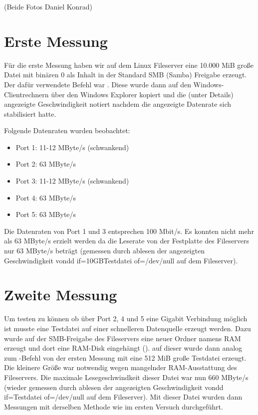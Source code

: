 \documentclass[12pt,a4paper,titlepage]{scrartcl} %
\begin{document}
(Beide Fotos \textcopyright Daniel Konrad)

\newpage
\section{Erste Messung}
Für die erste Messung haben wir auf dem Linux Fileserver eine 10.000 MiB große Datei mit binären 0 als Inhalt in der Standard SMB (Samba) Freigabe erzeugt. Der dafür verwendete Befehl war \normalfont. Diese wurde dann auf den Windows-Clientrechnern über  den Windows Explorer kopiert und die (unter Details) angezeigte Geschwindigkeit notiert nachdem die angezeigte Datenrate sich stabilisiert hatte.

Folgende Datenraten wurden beobachtet:
\begin{itemize}
\item Port 1: 11-12 MByte/s (schwankend)
\item Port 2: 63 MByte/s
\item Port 3: 11-12 MByte/s (schwankend)
\item Port 4: 63 MByte/s
\item Port 5: 63 MByte/s
\end{itemize}
Die Datenraten von Port 1 und 3 entsprechen 100 Mbit/s.
Es konnten nicht mehr als 63 MByte/s erzielt werden da die Leserate von der Festplatte des Fileservers nur 63 MByte/s beträgt (gemessen durch ablesen der angezeigten Geschwindigkeit von\ttfamily dd if=10GBTestdatei of=/dev/null \normalfont auf dem Fileserver).

\newpage
\section{Zweite Messung}
Um testen zu können ob über Port 2, 4 und 5 eine Gigabit Verbindung möglich ist musste eine Testdatei auf einer schnelleren Datenquelle erzeugt werden. Dazu wurde auf der SMB-Freigabe des Fileservers eine neuer Ordner namens RAM erzeugt und dort eine RAM-Disk eingehängt (\normalfont). auf dieser wurde dann analog zum \normalfont-Befehl von der ersten Messung mit \normalfont eine 512 MiB große Testdatei erzeugt. Die kleinere Größe war notwendig wegen mangelnder RAM-Ausstattung des Fileservers. Die maximale Lesegeschwindkeit dieser Datei war nun 660 MByte/s (wieder gemessen durch ablesen der angezeigten Geschwindigkeit von\ttfamily dd if=Testdatei of=/dev/null \normalfont auf dem Fileserver). Mit dieser Datei wurden dann Messungen mit derselben Methode wie im ersten Versuch durchgeführt.
\end{document}
